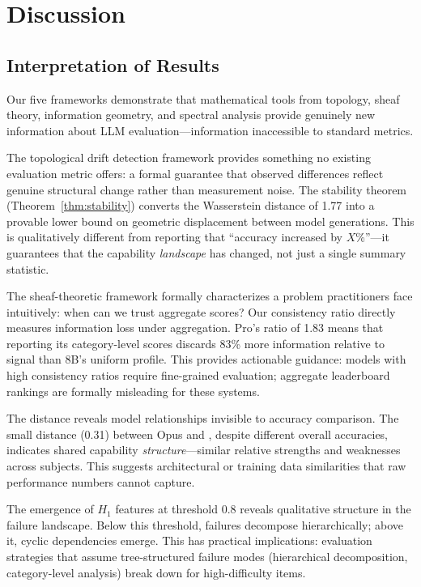 \section{Discussion}
\label{sec:discussion}

\subsection{Interpretation of Results}

Our five frameworks demonstrate that mathematical tools from topology, sheaf theory, information geometry, and spectral analysis provide genuinely new information about LLM evaluation---information inaccessible to standard metrics.

The topological drift detection framework provides something no existing evaluation metric offers: a formal guarantee that observed differences reflect genuine structural change rather than measurement noise.
The stability theorem (Theorem~\ref{thm:stability}) converts the Wasserstein distance of 1.77 into a provable lower bound on geometric displacement between model generations.
This is qualitatively different from reporting that ``accuracy increased by $X$\%''---it guarantees that the capability \emph{landscape} has changed, not just a single summary statistic.

The sheaf-theoretic framework formally characterizes a problem practitioners face intuitively: when can we trust aggregate scores?
Our consistency ratio directly measures information loss under aggregation.
 Pro's ratio of 1.83 means that reporting its category-level scores discards 83\% more information relative to signal than \llama 8B's uniform profile.
This provides actionable guidance: models with high consistency ratios require fine-grained evaluation; aggregate leaderboard rankings are formally misleading for these systems.

The \fr distance reveals model relationships invisible to accuracy comparison.
The small distance (0.31) between \claude Opus and \gpt, despite different overall accuracies, indicates shared capability \emph{structure}---similar relative strengths and weaknesses across subjects.
This suggests architectural or training data similarities that raw performance numbers cannot capture.

The emergence of $H_1$ features at threshold 0.8 reveals qualitative structure in the failure landscape.
Below this threshold, failures decompose hierarchically; above it, cyclic dependencies emerge.
This has practical implications: evaluation strategies that assume tree-structured failure modes (hierarchical decomposition, category-level analysis) break down for high-difficulty items.

